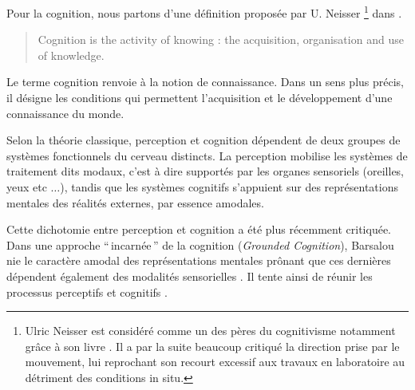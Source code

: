 
Pour la cognition, nous partons d'une définition proposée par U. Neisser \footnote{Ulric Neisser est considéré comme un des pères du cognitivisme notamment grâce à son livre \citep{neisser1967cognitive}. Il a par la suite beaucoup critiqué la direction prise par le mouvement, lui reprochant son recourt excessif aux travaux en laboratoire au détriment des conditions in situ.} dans \citep[p. ??]{neisser1976cognition} .

\begin{quote}
Cognition is the activity of knowing : the acquisition, organisation and use of knowledge.
\end{quote}

Le terme cognition renvoie à la notion de connaissance. Dans un sens plus précis, il désigne les conditions qui permettent l'acquisition et le développement d'une connaissance du monde.

Selon la théorie classique, perception et cognition dépendent de deux groupes de systèmes fonctionnels du cerveau distincts. La perception mobilise les systèmes de traitement dits modaux, c'est à dire supportés par les organes sensoriels (oreilles, yeux etc $\ldots$), tandis que les systèmes cognitifs s'appuient sur des représentations mentales des réalités externes, par essence amodales.

Cette dichotomie entre perception et cognition a été plus récemment critiquée. Dans une approche ``\,incarnée\,'' de la cognition (\emph{Grounded Cognition}), Barsalou nie le caractère amodal des représentations mentales prônant que ces dernières dépendent également des modalités sensorielles \citep{barsalou2010grounded}. Il tente ainsi de réunir les processus perceptifs et cognitifs \citep{goldstone1998reuniting, barsalou1999perceptions}. 

